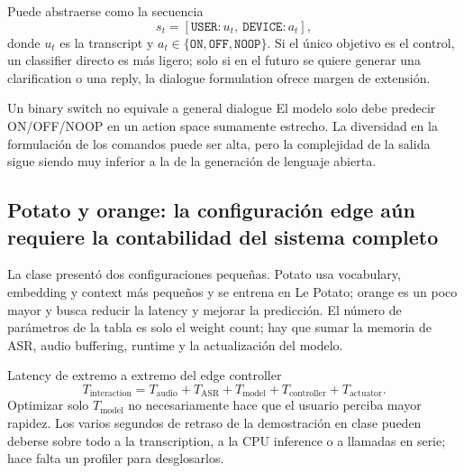 
Puede abstraerse como la secuencia
\[
s_t=[\texttt{USER}:u_t,\ \texttt{DEVICE}:a_t],
\]
donde $u_t$ es la transcript y $a_t\in\{\texttt{ON},\texttt{OFF},\texttt{NOOP}\}$. Si el único objetivo es el control, un classifier directo es más ligero; solo si en el futuro se quiere generar una clarification o una reply, la dialogue formulation ofrece margen de extensión.

\begin{warningbox}{Un binary switch no equivale a general dialogue}
El modelo solo debe predecir ON/OFF/NOOP en un action space sumamente estrecho. La diversidad en la formulación de los comandos puede ser alta, pero la complejidad de la salida sigue siendo muy inferior a la de la generación de lenguaje abierta.
\end{warningbox}

\subsection{Potato y orange: la configuración edge aún requiere la contabilidad del sistema completo}

La clase presentó dos configuraciones pequeñas. Potato usa vocabulary, embedding y context más pequeños y se entrena en Le Potato; orange es un poco mayor y busca reducir la latency y mejorar la predicción. El número de parámetros de la tabla es solo el weight count; hay que sumar la memoria de ASR, audio buffering, runtime y la actualización del modelo.


\begin{knowledgebox}{Latency de extremo a extremo del edge controller}
\[
T_{\text{interaction}}=T_{\text{audio}}+T_{\text{ASR}}+T_{\text{model}}
+T_{\text{controller}}+T_{\text{actuator}}.
\]
Optimizar solo $T_{\text{model}}$ no necesariamente hace que el usuario perciba mayor rapidez. Los varios segundos de retraso de la demostración en clase pueden deberse sobre todo a la transcription, a la CPU inference o a llamadas en serie; hace falta un profiler para desglosarlos.
\end{knowledgebox}


